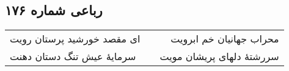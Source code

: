\begin{center}
\section*{رباعی شماره ۱۷۶}
\label{sec:sh176}
\begin{longtable}{l p{0.5cm} r}
ای مقصد خورشید پرستان رویت
&&
محراب جهانیان خم ابرویت
\\
سرمایهٔ عیش تنگ دستان دهنت
&&
سررشتهٔ دلهای پریشان مویت
\\
\end{longtable}
\end{center}
